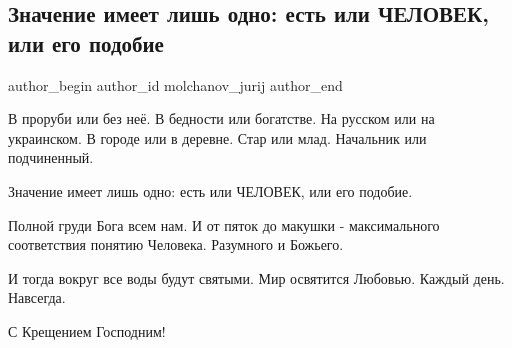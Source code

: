  
 
 
 
 
 
\subsection{Значение имеет лишь одно: есть или ЧЕЛОВЕК, или его подобие}
\label{sec:19_01_2022.fb.molchanov_jurij.1.chelovek_kreschenie}
 
\ifcmt
 author_begin
   author_id molchanov_jurij
 author_end
\fi

В проруби или без неё. В бедности или богатстве. На русском или на украинском.
В городе или в деревне. Стар или млад. Начальник или подчиненный.

Значение имеет лишь одно: есть или ЧЕЛОВЕК, или его подобие.

Полной груди Бога всем нам. И от пяток до макушки - максимального соответствия
понятию Человека. Разумного и Божьего.

И тогда вокруг все воды будут святыми. Мир освятится Любовью. Каждый день.
Навсегда.

С Крещением Господним!

